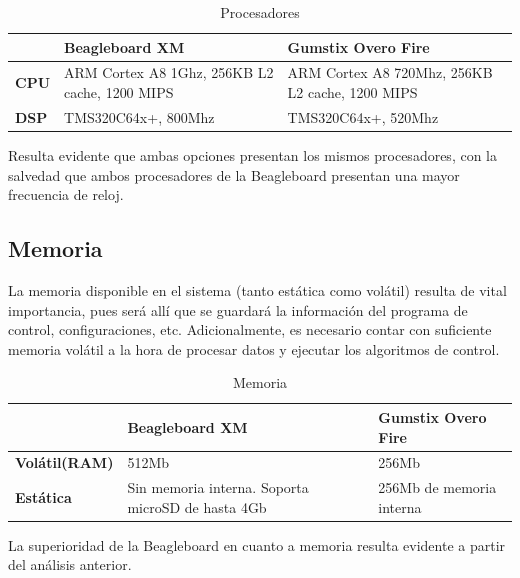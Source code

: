 \documentclass[main]{subfiles}
\begin{document}
\begin{table}[H]
\begin{tabular}{p{130pt}|p{130pt}|p{130pt}|} 
\cline{2-3}
& \cellcolor[gray]{0.8} \textbf{Beagleboard XM} 
& \cellcolor[gray]{0.8} \textbf{Gumstix Overo Fire} \\ \cline{1-3} \hline
\multicolumn{1}{|p{130pt}|}{\cellcolor[gray]{0.8}\textbf{CPU}} 
&ARM Cortex A8 1Ghz,  256KB L2 cache, 1200 MIPS &ARM Cortex A8 720Mhz, 256KB L2 cache, 1200 MIPS \\ 
\hline 
\multicolumn{1}{|p{130pt}|}{\cellcolor[gray]{0.8}\textbf{DSP}} 
&TMS320C64x+, 800Mhz &TMS320C64x+, 520Mhz\\
\hline
\end{tabular}
\caption{Procesadores}
\label{tab:procesadores}
\end{table}

Resulta evidente que ambas opciones presentan los mismos procesadores, con la salvedad que ambos procesadores de la Beagleboard presentan una mayor frecuencia de reloj. 

\subsection*{Memoria}

La memoria disponible en el sistema (tanto est\'atica como vol\'atil) resulta de vital importancia, pues ser\'a all\'i que se guardar\'a la informaci\'on del programa de control, configuraciones, etc. Adicionalmente, es necesario contar con suficiente memoria vol\'atil a la hora de procesar datos y ejecutar los algoritmos de control.\\

\begin{table}[H]
\begin{tabular}{p{130pt}|p{130pt}|p{130pt}|} 
\cline{2-3}
& \cellcolor[gray]{0.8} \textbf{Beagleboard XM} 
& \cellcolor[gray]{0.8} \textbf{Gumstix Overo Fire} \\ \cline{1-3} \hline
\multicolumn{1}{|p{130pt}|}{\cellcolor[gray]{0.8}\textbf{Vol\'atil(RAM)}} 
&512Mb & 256Mb\\ 
\hline 
\multicolumn{1}{|p{130pt}|}{\cellcolor[gray]{0.8}\textbf{Est\'atica}} 
&Sin memoria interna.  Soporta microSD de hasta 4Gb  &256Mb de memoria interna\\
\hline
\end{tabular}
\caption{Memoria}
\label{tab:memoria}
\end{table}

La superioridad de la Beagleboard en cuanto a memoria resulta evidente a partir del an\'alisis anterior.
\end{document}
